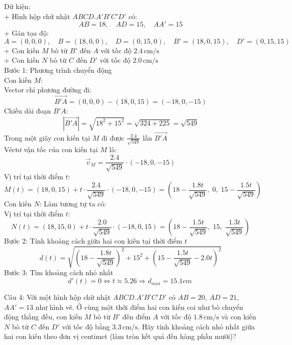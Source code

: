 \documentclass[a4paper,12pt]{article}
\begin{document}
Dữ kiện:\\
+ Hình hộp chữ nhật \(ABCD.A'B'C'D'\) có:\\
\[
AB = 18,\quad AD = 15,\quad AA' = 15
\]
+ Gán tọa độ:
\[
A = (0, 0, 0),\quad B = (18, 0, 0),\quad D = (0, 15, 0),\quad B' = (18, 0, 15),\quad D' = (0, 15, 15)
\]
+ Con kiến \(M\) bò từ \(B'\) đến \(A\) với tốc độ \(2.4\, \text{cm/s}\)\\
+ Con kiến \(N\) bò từ \(C\) đến \(D'\) với tốc độ \(2.0\, \text{cm/s}\)\\
Bước 1: Phương trình chuyển động\\
Con kiến \(M\):\\
Vector chỉ phương đường đi:
\[
\overrightarrow{B'A} = (0, 0, 0) - (18, 0, 15) = ( -18, 0, -15 )
\]
Chiều dài đoạn \(B'A\):
\[
|\overrightarrow{B'A}| = \sqrt{18^2 + 15^2} = \sqrt{324 + 225} = \sqrt{549}
\]
Trong một giây con kiến tại \(M\) đi được \(\frac{2.4}{\sqrt{549}}\) lần \(\overrightarrow{B'A}\)\\
Véctơ vận tốc của con kiến tại \(M\) là:
\[
\overrightarrow{v}_M = \frac{2.4}{\sqrt{549}} \cdot ( -18, 0, -15 )
\]
Vị trí tại thời điểm \(t\):
\[
M(t) = (18, 0, 15) + t \cdot \frac{2.4}{\sqrt{549}} \cdot ( -18, 0, -15 )
= \left( 18 - \frac{1.8t}{\sqrt{549}},\; 0,\; 15 - \frac{1.5t}{\sqrt{549}} \right)
\]
Con kiến \(N\): Làm tương tự ta có:\\
Vị trí tại thời điểm \(t\):
\[
N(t) = (18, 15, 0) + t \cdot \frac{2.0}{\sqrt{549}} \cdot (-18, 0, 15)
= \left( 18 - \frac{1.5t}{\sqrt{549}},\; 15,\; \frac{1.3t}{\sqrt{549}} \right)
\]
Bước 2: Tính khoảng cách giữa hai con kiến tại thời điểm \(t\)
\[
d(t) = \sqrt{\left(18 - \frac{1.8t}{\sqrt{549}}\right)^2 + 15^2 + \left(15 - \frac{1.5t}{\sqrt{549}} - 2.0t\right)^2}
\]
Bước 3: Tìm khoảng cách nhỏ nhất
\[
d'(t)=0\Leftrightarrow t \approx 5.26 \Rightarrow d_{min}=15.1cm\
\]




Câu 4: 
Với một hình hộp chữ nhật \(ABCD.A'B'C'D'\) có \(AB=20\), \(AD=21\), \(AA'=13\) như hình vẽ. Ở cùng một thời điểm hai con kiến coi như bò chuyển động thẳng đều, con kiến \(M\) bò từ \(B'\) đến điểm \(A\) với tốc độ \(1.8\,\mathrm{cm/s}\) và con kiến \(N\) bò từ \(C\) đến \(D'\) với tốc độ bằng \(3.3\,\mathrm{cm/s}\). Hãy tính khoảng cách nhỏ nhất giữa hai con kiến theo đơn vị centimet (làm tròn kết quả đến hàng phần mười)?
\end{document}
